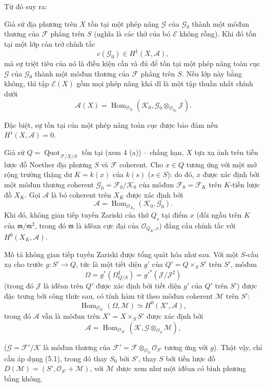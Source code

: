 Từ đó suy ra:

 Giả sử địa phương trên $X$ tồn tại một phép nâng
$\mathcal G$ của $\mathcal G_0$ thành một môđun thương của $\mathcal F$ phẳng
trên $S$ (nghĩa là các thớ của bó $\mathcal E$ không rỗng). Khi đó tồn tại một
lớp cản trở chính tắc
\[
c(\mathcal G_0)\in H^1(X,\mathcal A),
\]
mà sự triệt tiêu của nó là điều kiện cần và đủ để tồn tại một phép nâng toàn
cục $\mathcal G$ của $\mathcal G_0$ thành một môđun thương của $\mathcal F$
phẳng trên $S$. Nếu lớp này bằng không, thì tập $\mathcal E(X)$ gồm mọi phép
nâng khả dĩ là một tập thuần nhất chính dưới
\[
\mathcal A(X)=\operatorname{Hom}_{\mathcal O_X}
(\mathcal K_0,\mathcal G_0\otimes_{\mathcal O_{S_0}}\mathcal J).
\]

Đặc biệt, sự tồn tại của một phép nâng toàn cục được bảo đảm nếu
$H^1(X,\mathcal A)=0$.

 Giả sử
$Q=\operatorname{Quot}_{\mathcal F/X/S}$ tồn tại (xem 4 (a)) -- chẳng hạn,
$X$ tựa xạ ảnh trên tiền lược đồ Noether địa phương $S$ và $\mathcal F$ coherent. Cho
$x\in Q$ tương ứng với một mở rộng trường thặng dư $K=k(x)$ của $k(s)$
($s\in S$):
do đó, $x$ được xác định bởi một môđun thương coherent
$\mathcal G_0=\mathcal F_0/\mathcal K_0$ của môđun
$\mathcal F_0=\mathcal F_K$ trên $K$-tiền lược đồ $X_K$. Gọi $\mathcal A$ là
bó coherent trên $X_K$ được xác định bởi
\[
\mathcal A=\operatorname{Hom}_{\mathcal O_{X_0}}(\mathcal K_0,\mathcal G_0).
\]
Khi đó, không gian tiếp tuyến Zariski của thớ $Q_s$ tại điểm $x$ (đối ngẫu trên
$K$ của $\mathfrak m/\mathfrak m^2$, trong đó $\mathfrak m$ là iđêan cực đại
của $\mathcal O_{Q_K,x}$) đẳng cấu chính tắc với $H^0(X_K,\mathcal A)$.

Mô tả không gian tiếp tuyến Zariski được tổng quát hóa như sau. Với một
$S$-cấu xạ cho trước $g:S'\longrightarrow Q$, tức là một tiết diện $g'$ của
$Q'=Q\times_SS'$ trên $S'$, môđun
\[
\Omega=g^*(\Omega^1_{Q/S})=g'^*(\mathcal J/\mathcal J^2)
\]
(trong đó $\mathcal J$ là iđêan trên $Q'$ được xác định bởi tiết diện $g'$ của
$Q'$ trên $S'$) được đặc trưng bởi công thức sau, có tính hàm tử theo môđun coherent
$\mathcal M$ trên $S'$:
\[
\operatorname{Hom}_{\mathcal O_{S'}}(\Omega,\mathcal M)
\simeq H^0(X',\mathcal A),
\]
trong đó $\mathcal A$ vẫn là môđun trên $X'=X\times_SS'$ được xác định bởi
\[
\mathcal A=\operatorname{Hom}_{\mathcal O_{X'}}
(\mathcal K,\mathcal G\otimes_{\mathcal O_S}\mathcal M),
\]

($\mathcal G=\mathcal F'/\mathcal K$ là môđun thương của
$\mathcal F'=\mathcal F\otimes_{\mathcal O_S}\mathcal O_{S'}$ tương ứng với
$g$). Thật vậy, chỉ cần áp dụng (5.1), trong đó thay $S_0$ bởi $S'$, thay $S$
bởi tiền lược đồ $D(\mathcal M)=(S',\mathcal O_{S'}+\mathcal M)$, với
$\mathcal M$ được xem như một iđêan có bình phương bằng không.

